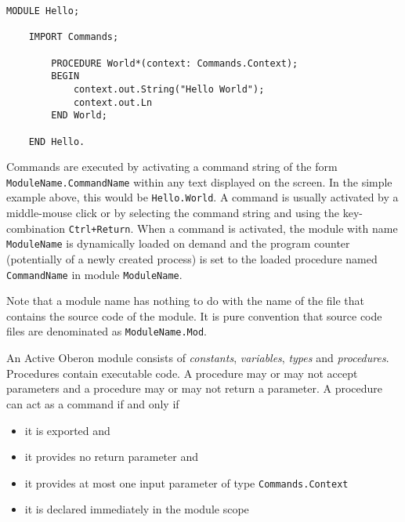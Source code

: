 \documentclass[a4paper,11pt]{article}
\begin{document}
\begin{lstlisting}[language=Oberon,frame=none,caption=A simple Oberon Module]
    MODULE Hello;

    IMPORT Commands;

        PROCEDURE World*(context: Commands.Context);
        BEGIN
            context.out.String("Hello World");
            context.out.Ln
        END World;

    END Hello.
\end{lstlisting}

Commands are executed by activating a command string of the form \verb+ModuleName.CommandName+ within any text displayed on the screen. In the simple example above, this would be \verb+Hello.World+. A command is usually activated by a middle-mouse click or by selecting the command string and using the key-combination \verb|Ctrl+Return|. When a command is activated, the module with name \verb+ModuleName+ is dynamically loaded on demand and the program counter (potentially of a newly created process) is set to the loaded procedure named \verb+CommandName+ in module \verb+ModuleName+.

Note that a module name has nothing to do with the name of the file that contains the source code of the module. It is pure convention that source code files are denominated as \verb+ModuleName.Mod+.

An Active Oberon module consists of {\em constants}, {\em variables}, {\em types} and {\em procedures}. Procedures contain executable code. A procedure may or may not accept parameters and a procedure may or may not return a parameter. A procedure can act as a command if and only if
\begin{itemize}
\item it is exported and
\item it provides no return parameter and
\item it provides at most one input parameter of type \verb+Commands.Context+
\item it is declared immediately in the module scope
\end{itemize}
\end{document}
